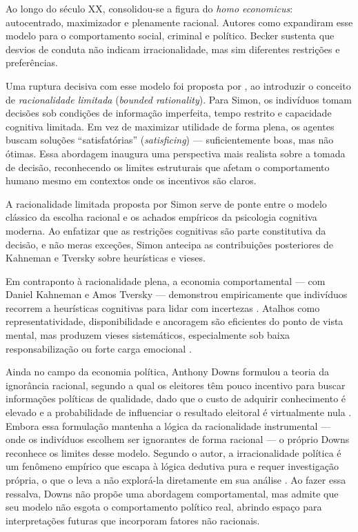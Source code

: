Ao longo do século XX, consolidou-se a figura do \textit{homo economicus}: autocentrado, maximizador e plenamente racional. Autores como  expandiram esse modelo para o comportamento social, criminal e político. Becker sustenta que desvios de conduta não indicam irracionalidade, mas sim diferentes restrições e preferências.

Uma ruptura decisiva com esse modelo foi proposta por , ao introduzir o conceito de \textit{racionalidade limitada} (\textit{bounded rationality}). Para Simon, os indivíduos tomam decisões sob condições de informação imperfeita, tempo restrito e capacidade cognitiva limitada. Em vez de maximizar utilidade de forma plena, os agentes buscam soluções ``satisfatórias'' (\textit{satisficing}) — suficientemente boas, mas não ótimas. Essa abordagem inaugura uma perspectiva mais realista sobre a tomada de decisão, reconhecendo os limites estruturais que afetam o comportamento humano mesmo em contextos onde os incentivos são claros.

A racionalidade limitada proposta por Simon serve de ponte entre o modelo clássico da escolha racional e os achados empíricos da psicologia cognitiva moderna. Ao enfatizar que as restrições cognitivas são parte constitutiva da decisão, e não meras exceções, Simon antecipa as contribuições posteriores de Kahneman e Tversky sobre heurísticas e vieses.

Em contraponto à racionalidade plena, a economia comportamental — com Daniel Kahneman e Amos Tversky — demonstrou empiricamente que indivíduos recorrem a heurísticas cognitivas para lidar com incertezas \cite{Judgment_under_Uncertainty}. Atalhos como representatividade, disponibilidade e ancoragem são eficientes do ponto de vista mental, mas produzem vieses sistemáticos, especialmente sob baixa responsabilização ou forte carga emocional \cite{kahneman2011thinking}.

Ainda no campo da economia política, Anthony Downs formulou a teoria da ignorância racional, segundo a qual os eleitores têm pouco incentivo para buscar informações políticas de qualidade, dado que o custo de adquirir conhecimento é elevado e a probabilidade de influenciar o resultado eleitoral é virtualmente nula \cite{downs1957economic}. Embora essa formulação mantenha a lógica da racionalidade instrumental — onde os indivíduos escolhem ser ignorantes de forma racional — o próprio Downs reconhece os limites desse modelo. Segundo o autor, a irracionalidade política é um fenômeno empírico que escapa à lógica dedutiva pura e requer investigação própria, o que o leva a não explorá-la diretamente em sua análise \cite{downs1957economic}. Ao fazer essa ressalva, Downs não propõe uma abordagem comportamental, mas admite que seu modelo não esgota o comportamento político real, abrindo espaço para interpretações futuras que incorporam fatores não racionais.

